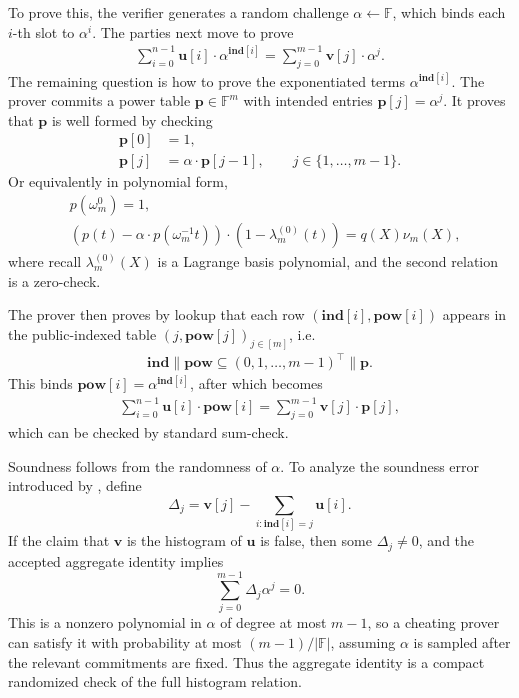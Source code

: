 To prove this, the verifier generates a random challenge
$\alpha\gets \mathbb{F}$, which binds each $i$-th slot to $\alpha^i$. The parties next move to prove
\begin{align}
    \sum_{i=0}^{n-1}\mathbf{u}[i]\cdot \alpha^{\mathbf{ind}[i]}
    =
    \sum_{j=0}^{m-1}\mathbf{v}[j]\cdot \alpha^j.\label{eq:histogram-aggregation-power-sum}
\end{align}
The remaining question is how to prove the exponentiated terms
$\alpha^{\mathbf{ind}[i]}$.
The prover commits a power table
$\mathbf{p}\in\mathbb{F}^{m}$ with intended entries
$\mathbf{p}[j]=\alpha^j$. It proves that $\mathbf{p}$ is well formed by
checking
\begin{align}
    \mathbf{p}[0]&=1,\\
    \mathbf{p}[j]&=\alpha\cdot \mathbf{p}[j-1],
    \qquad j\in\{1,\ldots,m-1\}.
\end{align}
Or equivalently in polynomial form,
\begin{align}
    &p(\omega_m^0) = 1,\\
    &(p(t) - \alpha\cdot p(\omega_m^{-1} t))\cdot (1 - \lambda_m^{(0)}(t)) = q(X)\nu_{m}(X),
\end{align}
where recall $\lambda_m^{(0)}(X)$ is a Lagrange
basis polynomial, and the second relation 
is a zero-check.

The prover then proves by lookup that each row
$(\mathbf{ind}[i],\mathbf{pow}[i])$ appears in the public-indexed table
$(j,\mathbf{pow}[j])_{j\in[m]}$, i.e.
\begin{align}
    \mathbf{ind}\| \mathbf{pow}\subseteq (0, 1, \dots, m-1)^\top\| \mathbf{p}.
\end{align}
This binds
$\mathbf{pow}[i]=\alpha^{\mathbf{ind}[i]}$, after which
becomes
\begin{align}
    \sum_{i=0}^{n-1}\mathbf{u}[i]\cdot \mathbf{pow}[i]
    =
    \sum_{j=0}^{m-1}\mathbf{v}[j]\cdot \mathbf{p}[j],
\end{align}
which can be checked by standard sum-check.

Soundness follows from the randomness of $\alpha$. 
To analyze the soundness error introduced by
,
define
\[
    \Delta_j
    =
    \mathbf{v}[j]
    -
    \sum_{i:\mathbf{ind}[i]=j}\mathbf{u}[i].
\]
If the claim that $\mathbf{v}$ is the histogram of $\mathbf{u}$ is false, 
then some $\Delta_j\neq 0$, and the accepted aggregate identity implies
\[
    \sum_{j=0}^{m-1}\Delta_j\alpha^j=0.
\]
This is a nonzero polynomial in $\alpha$ of degree at most $m-1$, so a cheating
prover can satisfy it with probability at most $(m-1)/|\mathbb{F}|$, assuming
$\alpha$ is sampled after the relevant commitments are fixed. Thus the
aggregate identity is a compact randomized check of the full histogram relation.